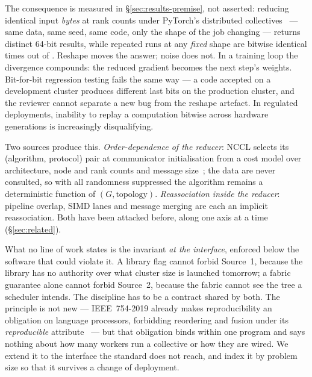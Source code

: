 \documentclass[journal,10pt]{IEEEtran}
\theoremstyle{plain}
\theoremstyle{definition}
\theoremstyle{remark}
\begin{document}
The consequence is measured in \S\ref{sec:results-premise}, not asserted:
reducing identical input \emph{bytes} at \GpuWorldSizes{} rank counts under
PyTorch's distributed collectives~\cite{li2020pytorch} --- same data, same
seed, same code, only the shape of the job changing --- returns
\GpuRootsDistinct{} distinct 64-bit results, while repeated runs at any
\emph{fixed} shape are bitwise identical \GpuRepeats{} times out of
\GpuRepeats{}. Reshape moves the answer; noise does not. In a training loop
the divergence compounds: the reduced gradient becomes the next step's
weights. Bit-for-bit regression testing fails the same way --- a code accepted
on a development cluster produces different last bits on the production
cluster, and the reviewer cannot separate a new bug from the reshape
artefact. In regulated deployments, inability to replay a computation bitwise
across hardware generations is increasingly disqualifying.

Two sources produce this. \emph{Order-dependence of the reducer}: NCCL selects
its (algorithm, protocol) pair at communicator initialisation from a cost
model over architecture, node and rank counts and message
size~\cite{nccl2018}; the data are never consulted, so with all randomness
suppressed the algorithm remains a deterministic function of
$(G,\text{topology})$. \emph{Reassociation inside the reducer}: pipeline
overlap, SIMD lanes and message merging are each an implicit reassociation.
Both have been attacked before, along one axis at a time
(\S\ref{sec:related}).

What no line of work states is the invariant \emph{at the interface}, enforced
below the software that could violate it. A library flag cannot forbid
Source~1, because the library has no authority over what cluster size is
launched tomorrow; a fabric guarantee alone cannot forbid Source~2, because
the fabric cannot see the tree a scheduler intends. The discipline has to be a
contract shared by both. The principle is not new --- IEEE~754-2019 already
makes reproducibility an obligation on language processors, forbidding
reordering and fusion under its \emph{reproducible}
attribute~\cite{ieee754-2019} --- but that obligation binds within one
program and says nothing about how many workers run a collective or how they
are wired. We extend it to the interface the standard does not reach, and
index it by problem size so that it survives a change of deployment.
\end{document}
